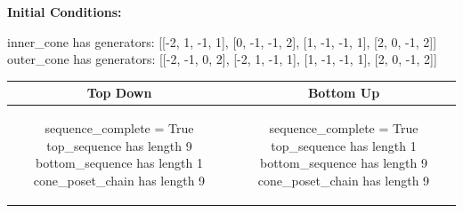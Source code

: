 \documentclass[10pt]{article}
\begin{document}
\textbf{Initial Conditions:}
\begin{SAGE}
inner_cone has generators: 
[[-2, 1, -1, 1], [0, -1, -1, 2], [1, -1, -1, 1], [2, 0, -1, 2]]
outer_cone has generators: 
[[-2, -1, 0, 2], [-2, 1, -1, 1], [1, -1, -1, 1], [2, 0, -1, 2]]

\end{SAGE}
\begin{tabular}{c|c}
\textbf{Top Down} & \textbf{Bottom Up} \\ \hline  
\begin{SAGE}
sequence_complete = True
top_sequence has length 9
bottom_sequence has length 1
cone_poset_chain has length 9
\end{SAGE} 
&
\begin{SAGE}
sequence_complete = True
top_sequence has length 1
bottom_sequence has length 9
cone_poset_chain has length 9
\end{SAGE} 
\\ \hline


\end{tabular}
\end{document}
